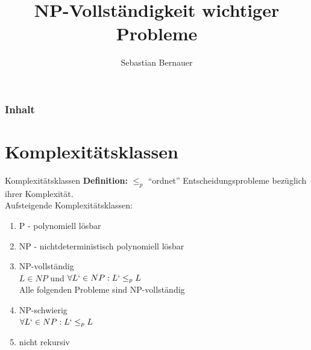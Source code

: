 \documentclass[12pt,donthandout,notes=dontshow,xcolor=table]{beamer}
\author{Sebastian Bernauer}
\title{NP-Vollständigkeit wichtiger Probleme}
\begin{document}
\begin{frame}
\titlepage
\end{frame}

\begin{frame}[allowframebreaks]
\frametitle{Inhalt}
\tableofcontents
\end{frame}

%

\section{Komplexitätsklassen}
\begin{frame}{Komplexitätsklassen}
\textbf{Definition:} \(\leq_p\) ``ordnet'' Entscheidungsprobleme bezüglich ihrer Komplexität.\\
Aufsteigende Komplexitätsklassen:
\begin{enumerate}
\item P - polynomiell lösbar
\pause
\item NP - nichtdeterministisch polynomiell lösbar
\pause
\item NP-vollständig\\
\textrightarrow \(L \in NP\) und \(\forall L` \in NP: L` \leq_p L\)\\
\pause
\textrightarrow Alle folgenden Probleme sind NP-vollständig
\pause
\item NP-schwierig\\
\textrightarrow \(\forall L` \in NP: L` \leq_p L\)
\pause
\item nicht rekursiv
\end{enumerate}
\end{frame}
\end{document}
